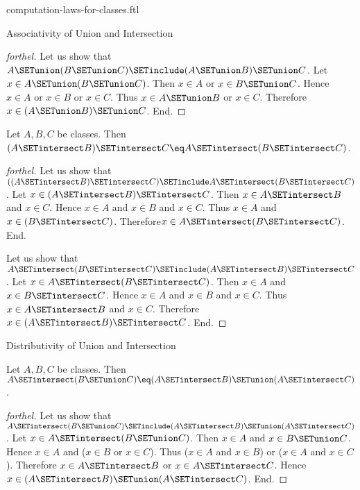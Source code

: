 \documentclass{naproche-library}
\begin{document}
\begin{smodule}[title=Computation Laws For Classes]{computation-laws-for-classes.ftl}
\begin{sfragment}{Associativity of Union and Intersection}
\begin{proof}[forthel]
    Let us show that $A \SETunion (B \SETunion C) \SETinclude (A \SETunion B) \SETunion C$.
      Let $x \in A \SETunion (B \SETunion C)$.
      Then $x \in A$ or $x \in B \SETunion C$.
      Hence $x \in A$ or $x \in B$ or $x \in C$.
      Thus $x \in A \SETunion B$ or $x \in C$.
      Therefore $x \in (A \SETunion B) \SETunion C$.
    End.
  \end{proof}

  \begin{proposition}[forthel,id=FOUNDATIONS_02_906751977193472]
    Let $A, B, C$ be classes.
    Then $(A \SETintersect B) \SETintersect C \eq A \SETintersect (B \SETintersect C)$.
  \end{proposition}
  \begin{proof}[forthel]
    Let us show that $((A \SETintersect B) \SETintersect C) \SETinclude A \SETintersect (B \SETintersect C)$. %
      Let $x \in (A \SETintersect B) \SETintersect C$.
      Then $x \in A \SETintersect B$ and $x \in C$.
      Hence $x \in A$ and $x \in B$ and $x \in C$.
      Thus $x \in A$ and $x \in (B \SETintersect C)$.
      Therefore$ x \in A \SETintersect (B \SETintersect C)$.
    End.

    Let us show that $A \SETintersect (B \SETintersect C) \SETinclude (A \SETintersect B) \SETintersect C$.
      Let $x \in A \SETintersect (B \SETintersect C)$.
      Then $x \in A$ and $x \in B \SETintersect C$.
      Hence $x \in A$ and $x \in B$ and $x \in C$.
      Thus $x \in A \SETintersect B$ and $x \in C$.
      Therefore $x \in (A \SETintersect B) \SETintersect C$.
    End.
  \end{proof}
\end{sfragment}

\begin{sfragment}{Distributivity of Union and Intersection}
  \begin{proposition}[forthel,id=FOUNDATIONS_02_371139087958016]
    Let $A, B, C$ be classes.
    Then $A \SETintersect (B \SETunion C) \eq (A \SETintersect B) \SETunion (A \SETintersect C)$.
  \end{proposition}
  \begin{proof}[forthel]
    Let us show that $A \SETintersect (B \SETunion C) \SETinclude (A \SETintersect B) \SETunion (A \SETintersect C)$.
      Let $x \in A \SETintersect (B \SETunion C)$.
      Then $x \in A$ and $x \in B \SETunion C$.
      Hence $x \in A$ and ($x \in B$ or $x \in C$).
      Thus ($x \in A$ and $x \in B$) or ($x \in A$ and $x \in C$).
      Therefore $x \in A \SETintersect B$ or $x \in A \SETintersect C$.
      Hence $x \in (A \SETintersect B) \SETunion (A \SETintersect C)$.
    End.


\end{proof}
\end{sfragment}
\end{smodule}
\end{document}
